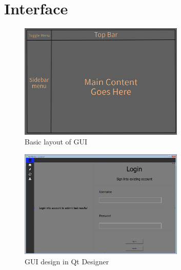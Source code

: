 \documentclass[12pt, titlepage]{article}
\begin{document}
\section{Interface}
\begin{figure}[h!]
  \begin{center}
  \includegraphics[width=0.7\textwidth]{GUI_sketch}
  \caption{Basic layout of GUI}
  \label{Fig_SystemContext} 
  \end{center}
  \end{figure}

\begin{figure}[hbt!]
  \begin{center}
  \includegraphics[width=0.7\textwidth]{GUI_designer}
  \caption{GUI design in Qt Designer}
  \label{Fig_SystemContext} 
  \end{center}
  \end{figure}

\end{document}
